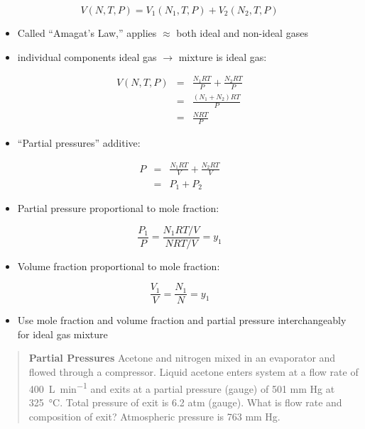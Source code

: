 \documentclass[11pt]{article}
\begin{document}
\[ V(N,T,P) = V_{1}(N_{1},T,P) + V_{2}(N_{2},T,P) \]

\begin{itemize}
\item Called ``Amagat's Law,'' applies $\approx$ both ideal and non-ideal gases

\item individual components ideal gas $\to$ mixture is ideal gas:
\end{itemize}
\begin{eqnarray*}
V(N,T,P) & =  & \frac{N_{1} R T}{P} + \frac{N_{2} R T}{P} \\
         & =  & \frac{(N_{1}+ N_{2}) R T}{P} \\
         & =  & \frac{N R T}{P}
\end{eqnarray*}

\begin{itemize}
\item ``Partial pressures'' additive:
\end{itemize}
\begin{eqnarray*}
 P & = & \frac{N_{1} R T}{V} + \frac{N_{2} R T}{V}\\
   & = & P_{1} + P_{2}
\end{eqnarray*}

\begin{itemize}
\item Partial pressure proportional to mole fraction:
\end{itemize}

\[ \frac{P_{1}}{P} = \frac{N_{1} RT/V}{N RT/V} = y_{1}\]

\begin{itemize}
\item Volume fraction proportional to mole fraction:
\end{itemize}

\[ \frac{V_{1}}{V} = \frac{N_{1}}{N} = y_{1} \]

\begin{itemize}
\item Use mole fraction and volume fraction and partial pressure interchangeably for ideal gas mixture
\end{itemize}

\begin{quote}
\hline
\textbf{Partial Pressures}  Acetone and nitrogen mixed in an evaporator and flowed through a compressor.  Liquid acetone enters system at a flow rate of \SI{400}{\liter\per\minute} and exits at a partial pressure (gauge) of 501 mm Hg at \SI{325}{\celsius}.  Total pressure of exit is 6.2 atm (gauge).  What is flow rate and composition of exit?  Atmospheric pressure is 763 mm Hg.
\hline
\end{quote}
\end{document}
